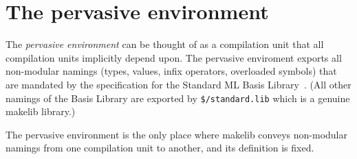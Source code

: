 
\section{The pervasive environment}

The {\em pervasive environment} can be thought of as a compilation
unit that all compilation units implicitly depend upon.  The pervasive
enviroment exports all non-modular namings (types, values, infix
operators, overloaded symbols) that are mandated by the specification
for the Standard ML Basis Library~\cite{reppy99:basis}.  (All other
namings of the Basis Library are exported by {\tt \$/standard.lib} which is
a genuine makelib library.)

The pervasive environment is the only place where makelib conveys
non-modular namings from one compilation unit to another, and its
definition is fixed.
